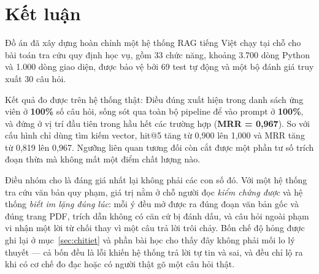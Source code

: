 \section{Kết luận}

Đồ án đã xây dựng hoàn chỉnh một hệ thống RAG tiếng Việt chạy tại chỗ cho bài toán tra cứu quy
định học vụ, gồm 33 chức năng, khoảng 3.700 dòng Python và 1.000 dòng giao diện, được bảo vệ
bởi 69 test tự động và một bộ đánh giá truy xuất 30 câu hỏi.

Kết quả đo được trên hệ thống thật: Điều đúng xuất hiện trong danh sách ứng viên ở
\textbf{100\%} số câu hỏi, sống sót qua toàn bộ pipeline để vào prompt ở \textbf{100\%}, và
đứng ở vị trí đầu tiên trong hầu hết các trường hợp (\textbf{MRR = 0,967}). So với cấu hình chỉ
dùng tìm kiếm vector, hit@5 tăng từ 0,900 lên 1,000 và MRR tăng từ 0,819 lên 0,967. Ngưỡng liên
quan tương đối còn cắt được một phần tư số trích đoạn thừa mà không mất một điểm chất lượng
nào.

Điều nhóm cho là đáng giá nhất lại không phải các con số đó. Với một hệ thống tra cứu văn bản
quy phạm, giá trị nằm ở chỗ người đọc \emph{kiểm chứng được} và hệ thống \emph{biết im lặng
đúng lúc}: mỗi ý đều mở được ra đúng đoạn văn bản gốc và đúng trang PDF, trích dẫn không có căn
cứ bị đánh dấu, và câu hỏi ngoài phạm vi nhận một lời từ chối thay vì một câu trả lời trôi
chảy. Bốn chế độ hỏng được ghi lại ở mục~\ref{sec:chitiet} và phần bài học cho thấy đây không
phải mối lo lý thuyết — cả bốn đều là lỗi khiến hệ thống trả lời tự tin và sai, và đều chỉ lộ
ra khi có cơ chế đo đạc hoặc có người thật gõ một câu hỏi thật.

\chapterbreak
